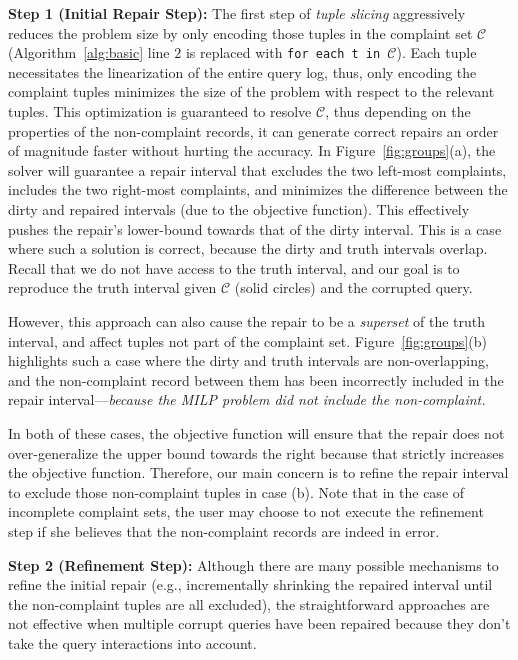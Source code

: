 \smallskip
\noindent\textbf{Step 1 (Initial Repair Step):}
The first step of  \emph{tuple slicing} 
aggressively reduces the problem size by only encoding those 
tuples in the complaint set $\mathcal{C}$ (Algorithm~\ref{alg:basic} line $2$
is replaced with \texttt{for each t in $\mathcal{C}$}). 
Each tuple necessitates
the linearization of the entire query log, thus, only encoding the complaint tuples minimizes the 
size of the problem with respect to the relevant tuples. 
This optimization is guaranteed to resolve $\mathcal{C}$, thus depending on the properties of the non-complaint records, it can generate correct repairs
an order of magnitude faster without hurting the accuracy. 
In Figure~\ref{fig:groups}(a),
the solver will guarantee a repair interval that excludes the two left-most complaints, includes the two right-most complaints,
and minimizes the difference between the dirty and repaired intervals (due to the objective function).
This effectively pushes the repair's lower-bound towards that of the dirty interval.
This is a case where such a solution is correct, because the dirty and truth intervals overlap.
Recall that we do not have access to the truth interval, and our goal is to reproduce the truth interval given $\mathcal{C}$ (solid circles) and the corrupted query.

However, this approach can also cause the repair to be a {\it superset} of the truth interval, and affect tuples not part of the complaint set.
Figure~\ref{fig:groups}(b) highlights such a case where the dirty and truth intervals are non-overlapping, and the non-complaint record between them has been incorrectly included in the repair interval---\emph{because the MILP problem did not include the non-complaint.}





\indent In both of these cases, the objective function will ensure that the repair
does not over-generalize the upper bound towards the right because that strictly increases the objective function.
Therefore, our main concern is to refine the repair interval to exclude those non-complaint tuples in case (b).
Note that in the case of incomplete complaint sets, the user may choose to not execute the refinement step if she believes
that the non-complaint records are indeed in error.

\smallskip

\noindent\textbf{Step 2 (Refinement Step):} 
Although there are many possible mechanisms to refine the initial repair (e.g., incrementally shrinking
the repaired interval until the non-complaint tuples are all excluded), 
the straightforward approaches are not effective when multiple corrupt 
queries have been repaired because they don't take the query interactions into account.

